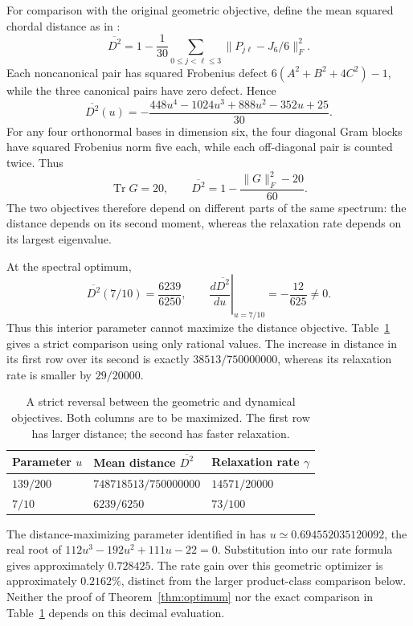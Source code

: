 \documentclass[11pt,a4paper]{article}
\theoremstyle{remark}
\DeclareMathOperator{\Tr}{Tr}
\begin{document}
For comparison with the original geometric objective, define the mean squared chordal distance as in \cite{rle}:
\begin{equation}\label{eq:distance}
 \overline{D^2}=1-\frac1{30}\sum_{0\le j<\ell\le3}
                             \|P_{j\ell}-J_6/6\|_F^2.
\end{equation}
Each noncanonical pair has squared Frobenius defect
$6(A^2+B^2+4C^2)-1$, while the three canonical pairs have zero defect. Hence
\begin{equation}\label{eq:distancepoly}
 \overline{D^2}(u)=
 -\frac{448u^4-1024u^3+888u^2-352u+25}{30}.
\end{equation}
For any four orthonormal bases in dimension six, the four diagonal Gram blocks have squared Frobenius norm five each, while each off-diagonal pair is counted twice. Thus
\[
 \Tr G=20,\qquad
 \overline{D^2}=1-\frac{\|G\|_F^2-20}{60}.
\]
The two objectives therefore depend on different parts of the same spectrum: the distance depends on its second moment, whereas the relaxation rate depends on its largest eigenvalue.

At the spectral optimum,
\begin{equation}\label{eq:distanceatopt}
 \overline{D^2}(7/10)=\frac{6239}{6250},\qquad
 \left.\frac{d\overline{D^2}}{du}\right|_{u=7/10}=-\frac{12}{625}\ne0.
\end{equation}
Thus this interior parameter cannot maximize the distance objective. Table~\ref{tab:comparison} gives a strict comparison using only rational values. The increase in distance in its first row over its second is exactly $38513/750000000$, whereas its relaxation rate is smaller by $29/20000$.
\begin{table}[H]
\centering
\begin{tabular}{@{}lll@{}}
\toprule
Parameter $u$ & Mean distance $\overline{D^2}$ & Relaxation rate $\gamma$\\
\midrule
$139/200$ & $748718513/750000000$ & $14571/20000$\\
$7/10$ & $6239/6250$ & $73/100$\\
\bottomrule
\end{tabular}
\caption{A strict reversal between the geometric and dynamical objectives. Both columns are to be maximized. The first row has larger distance; the second has faster relaxation.}\label{tab:comparison}
\end{table}
The distance-maximizing parameter identified in \cite{rle} has $u\simeq0.694552035120092$, the real root of $112u^3-192u^2+111u-22=0$. Substitution into our rate formula gives approximately $0.728425$. The rate gain over this geometric optimizer is approximately $0.2162\%$, distinct from the larger product-class comparison below. Neither the proof of Theorem~\ref{thm:optimum} nor the exact comparison in Table~\ref{tab:comparison} depends on this decimal evaluation.
\end{document}
